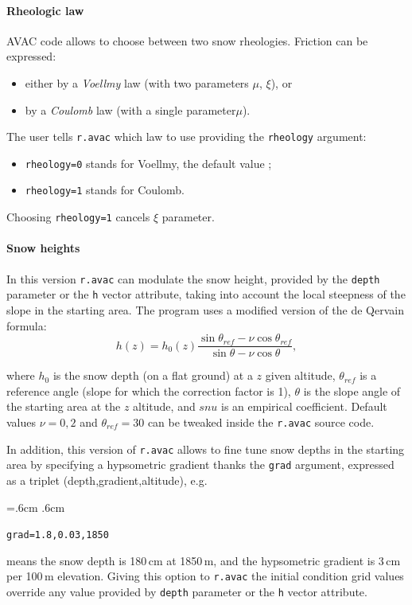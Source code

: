 \documentclass[12pt,oneside]{paper}
\newenvironment{code}{%
\vspace{2mm}%
\hangindent=.6cm%
\parindent.6cm%
\ttfamily%
\color{gris.3}%
}{
\vspace{2mm}%
}
\newcommand{\bei}{\begin{itemize}}
\newcommand{\eit}{\end{itemize}}
\begin{document}
\paragraph{Rheologic law}
AVAC code allows to choose between two snow rheologies. Friction can be expressed:
\bei
\item either by a \emph{Voellmy} law (with two parameters $\mu$, $\xi$), or
\item by a \emph{Coulomb} law (with a single parameter$\mu$).
\eit

The user tells \verb+r.avac+ which law to use providing the \verb+rheology+ argument:
\bei
\item \texttt{rheology=0} stands for Voellmy, the default value ;
\item \texttt{rheology=1} stands for Coulomb.
\eit
Choosing \verb+rheology=1+ cancels $\xi$ parameter.

\paragraph{Snow heights}
In this version \verb+r.avac+ can modulate the snow height, provided by the \verb+depth+ parameter or the \verb+h+ vector attribute, taking into account the local steepness of the slope in the starting area. The program uses a modified version of the de Qervain formula:
\[
h(z) = h_0(z) \frac{\sin\theta_{ref}-\nu \cos\theta_{ref}}{\sin\theta -\nu \cos\theta},
\]

where $h_0$ is the snow depth (on a flat ground) at a $z$ given altitude, $\theta_{ref}$ is a reference angle (slope for which the correction factor is 1), $\theta$ is the slope angle of the starting area at the $z$ altitude, and $snu$ is an empirical coefficient. Default values $\nu=0,2$ and $\theta_{ref}=30$ can be tweaked inside the \verb+r.avac+ source code.

In addition, this version of \verb+r.avac+ allows to fine tune snow depths in the starting area by specifying a hypsometric gradient thanks the \verb+grad+ argument, expressed as a triplet (depth,gradient,altitude), e.g.


\begin{code}
\texttt{grad=1.8,0.03,1850} 
\end{code}

means the snow depth is 180\,cm at 1850\,m, and the hypsometric gradient is 3\,cm per 100\,m elevation. Giving this option to \verb+r.avac+ the initial condition grid values override any value provided by \verb+depth+ parameter or the \verb+h+ vector attribute.
\end{document}
